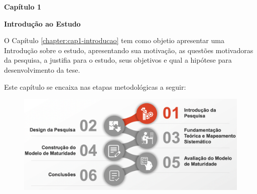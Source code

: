 \vspace{18cm}
\thispagestyle{plain}
\begin{center}
\textbf{\Huge Capítulo 1}
\end{center}
\begin{center}
\textbf{\Huge Introdução ao Estudo}
\end{center}
\noindent\makebox[\linewidth]{\rule{\textwidth}{1pt}} 
\begin{flushleft}
O Capítulo \ref{chapter:cap1-introducao} tem como objetio apresentar uma Introdução sobre o estudo, apresentando sua motivação, as questões motivadoras da pesquisa, a justifia para o estudo, seus objetivos e qual a hipótese para desenvolvimento da tese.

\end{flushleft}
\noindent\makebox[\linewidth]{\rule{\textwidth}{1pt}} 

Este capítulo se encaixa nas etapas metodológicas a seguir:
\begin{figure}[ht]
\centering
\includegraphics[width=15cm]{images/part-capitulo1.png}
\label{fig:metodologia-cap1}
\end{figure}